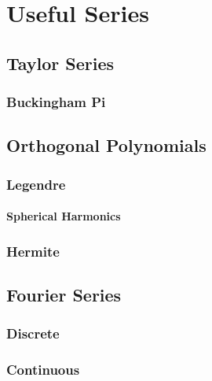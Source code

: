 \chapter{Useful Series}
\section{Taylor Series}
\subsection{Buckingham Pi}

\section{Orthogonal Polynomials}
\subsection{Legendre}
\subsubsection{Spherical Harmonics}
\subsection{Hermite}

\section{Fourier Series}
\subsection{Discrete}
\subsection{Continuous}
